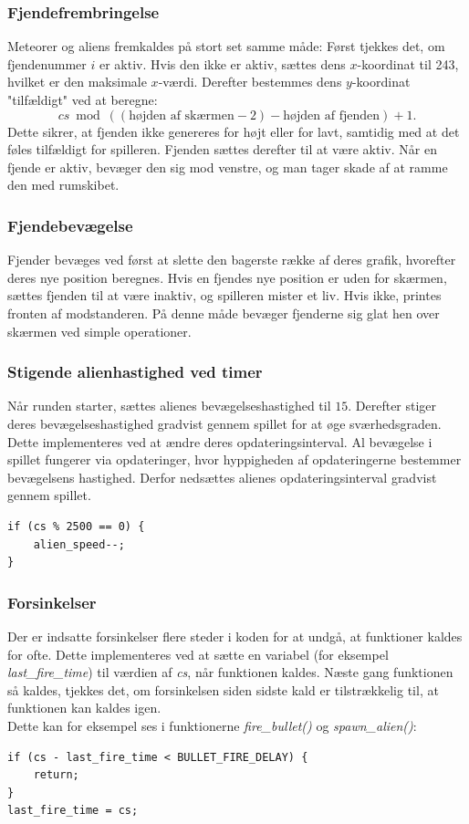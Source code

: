 \subsubsection{Fjendefrembringelse}
Meteorer og aliens fremkaldes på stort set samme måde: Først tjekkes det, om fjendenummer \(i\) er aktiv. Hvis den ikke er aktiv, sættes dens \(x\)-koordinat til 243, hvilket er den maksimale \(x\)-værdi. Derefter bestemmes dens \(y\)-koordinat "tilfældigt" ved at beregne:
\[
cs \bmod \left( (\text{højden af skærmen} - 2) - \text{højden af fjenden} \right) + 1.
\]
Dette sikrer, at fjenden ikke genereres for højt eller for lavt, samtidig med at det føles tilfældigt for spilleren. Fjenden sættes derefter til at være aktiv. Når en fjende er aktiv, bevæger den sig mod venstre, og man tager skade af at ramme den med rumskibet.

\subsubsection{Fjendebevægelse}
Fjender bevæges ved først at slette den bagerste række af deres grafik, hvorefter deres nye position beregnes. Hvis en fjendes nye position er uden for skærmen, sættes fjenden til at være inaktiv, og spilleren mister et liv. Hvis ikke, printes fronten af modstanderen. På denne måde bevæger fjenderne sig glat hen over skærmen ved simple operationer.

\subsubsection{Stigende alienhastighed ved timer}
Når runden starter, sættes alienes bevægelseshastighed til \(15\). Derefter stiger deres bevægelseshastighed gradvist gennem spillet for at øge sværhedsgraden. Dette implementeres ved at ændre deres opdateringsinterval.
Al bevægelse i spillet fungerer via opdateringer, hvor hyppigheden af opdateringerne bestemmer bevægelsens hastighed. Derfor nedsættes alienes opdateringsinterval gradvist gennem spillet.
\begin{lstlisting}[caption={Stigende alienhastighed kode}]
if (cs % 2500 == 0) {
    alien_speed--;
}
\end{lstlisting}

\subsubsection{Forsinkelser}
Der er indsatte forsinkelser flere steder i koden for at undgå, at funktioner kaldes for ofte. Dette implementeres ved at sætte en variabel (for eksempel \textit{last\_fire\_time}) til værdien af \textit{cs}, når funktionen kaldes. Næste gang funktionen så kaldes, tjekkes det, om forsinkelsen siden sidste kald er tilstrækkelig til, at funktionen kan kaldes igen.\\
Dette kan for eksempel ses i funktionerne \textit{fire\_bullet()} og \textit{spawn\_alien()}:
\begin{lstlisting}[caption={Forsinkelse kode}]
if (cs - last_fire_time < BULLET_FIRE_DELAY) {
    return;
}
last_fire_time = cs;
\end{lstlisting}

